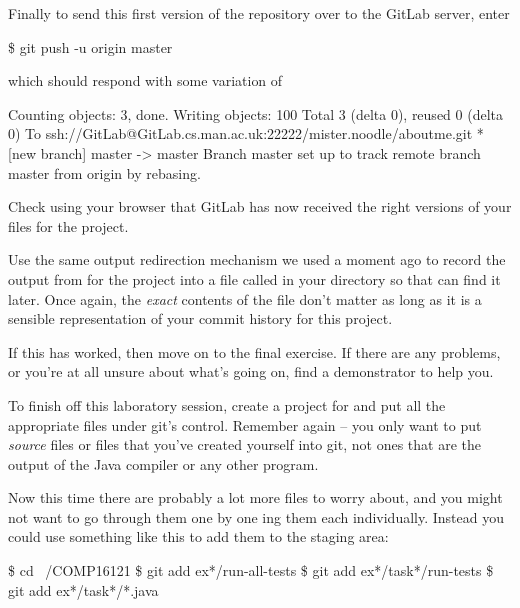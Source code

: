 Finally to send this first version of the repository over to the GitLab server, enter

\begin{ttoutenv}
\$ git push -u origin master
\end{ttoutenv}

which should respond with some variation of 

\begin{ttoutenv}
Counting objects: 3, done.
Writing objects: 100%
Total 3 (delta 0), reused 0 (delta 0)
To ssh://GitLab@GitLab.cs.man.ac.uk:22222/mister.noodle/aboutme.git
 * [new branch]      master -> master
Branch master set up to track remote branch master from origin by rebasing.
\end{ttoutenv}
 
Check using your browser that GitLab has now received the right versions of your files for the  project.

Use the same output redirection mechanism we used a moment ago to record the output from  for the  project into a file called  in your  directory so that  can find it later. Once again, the \emph{exact} contents of the file don't matter as long as it is a sensible representation of your commit history for this project.

If this has worked, then move on to the final exercise. If there are any problems, or you're at all unsure about what's going on, find a demonstrator to help you. 


To finish off this laboratory session, create a project for  and put all the appropriate files under git's control. Remember again -- you only want to put \emph{source} files or files that you've created yourself into git, not ones that are the output of the Java compiler or any other program.

Now this time there are probably a lot more files to worry about, and you might not want to go through them one by one ing them each individually. Instead you could use something like this to add them to the staging area:

\begin{ttoutenv}
\$ cd ~/COMP16121
\$ git add ex*/run-all-tests
\$ git add ex*/task*/run-tests
\$ git add ex*/task*/*.java
\end{ttoutenv}

